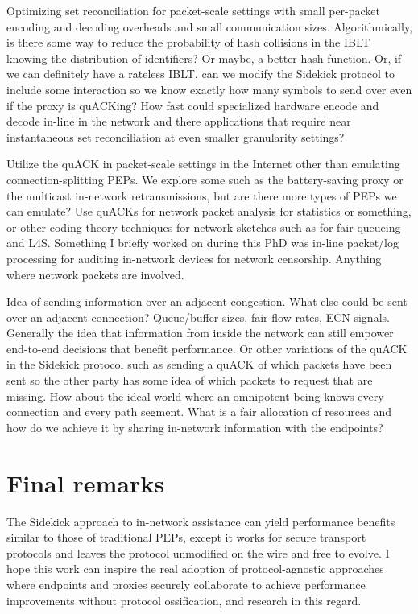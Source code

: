 Optimizing set reconciliation for packet-scale settings with small per-packet
encoding and decoding overheads and small communication sizes. Algorithmically,
is there some way to reduce the probability of hash collisions in the IBLT
knowing the distribution of identifiers? Or maybe, a better hash function. Or,
if we can definitely have a rateless IBLT, can we modify the Sidekick protocol
to include some interaction so we know exactly how many symbols to send over
even if the proxy is quACKing? How fast could specialized hardware encode and
decode in-line in the network and there applications that require near
instantaneous set reconciliation at even smaller granularity settings?

Utilize the quACK in packet-scale settings in the Internet other than emulating
connection-splitting PEPs. We explore some such as the battery-saving proxy or
the multicast in-network retransmissions, but are there more types of PEPs we
can emulate? Use quACKs for network packet analysis for statistics or
something, or other coding theory techniques for network sketches such as for
fair queueing and L4S. Something I briefly worked on during this PhD was
in-line packet/log processing for auditing in-network devices for network
censorship. Anything where network packets are involved.

Idea of sending information over an adjacent congestion. What else could be sent
over an adjacent connection? Queue/buffer sizes, fair flow rates, ECN signals.
Generally the idea that information from inside the network can still empower
end-to-end decisions that benefit performance. Or other variations of the quACK
in the Sidekick protocol such as sending a quACK of which packets have been
sent so the other party has some idea of which packets to request that are
missing. How about the ideal world where an omnipotent being knows every
connection and every path segment. What is a fair allocation of resources and
how do we achieve it by sharing in-network information with the endpoints?

\section{Final remarks}
\label{sec:conclusion:remarks}

The Sidekick approach to in-network assistance can yield performance benefits
similar to those of traditional PEPs, except it works for secure transport
protocols and leaves the protocol unmodified on the wire and free to evolve.
I hope this work can inspire the real adoption of protocol-agnostic approaches
where endpoints and proxies securely collaborate to achieve performance
improvements without protocol ossification, and research in this regard.

